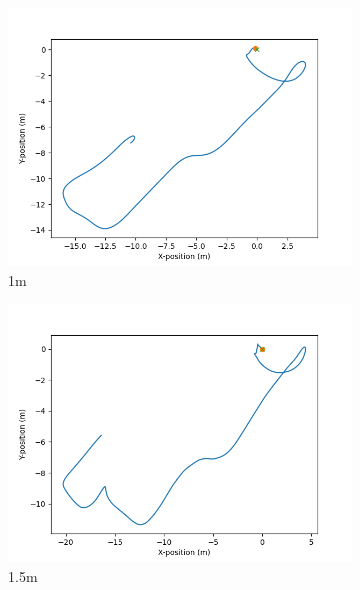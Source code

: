 \documentclass[class=article, crop=false]{standalone}
\begin{document}
\begin{figure}
\begin{subfigure}[b]{0.48\textwidth}
    \end{subfigure}
    \vfill
    \begin{subfigure}[b]{0.48\textwidth}
        \centering
        \includegraphics{scenario1/rov-0m/1.0m/usv_position_controlled}
        \caption{1m}
        \label{}
    \end{subfigure}
    \hfill
    \begin{subfigure}[b]{0.48\textwidth}
        \centering
        \includegraphics{scenario1/rov-0m/1.5m/usv_position_controlled}
        \caption{1.5m}
        \label{}
    \end{subfigure}
    \vfill
    \begin{subfigure}[b]{0.48\textwidth}
        \centering

\end{subfigure}
\end{figure}
\end{document}
